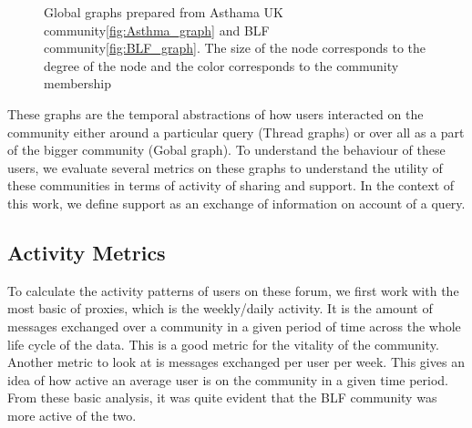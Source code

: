 \begin{figure}[!ht]
    \centering
    \caption{Global graphs prepared from Asthama UK community\ref{fig:Asthma_graph} and BLF community\ref{fig:BLF_graph}. The size of the node corresponds to the degree of the node and the color corresponds to the community membership }
\end{figure}

These graphs are the temporal abstractions of how users interacted on the community either around a particular query (Thread graphs) or over all as a part of the bigger community (Gobal graph). To understand the behaviour of these users, we evaluate several metrics on these graphs to understand the utility of these communities in terms of activity of sharing and support. In the context of this work, we define support as an exchange of information on account of a query.

\subsection{Activity Metrics}
To calculate the activity patterns of users on these forum, we first work with the most basic of proxies, which is the weekly/daily activity. It is the amount of messages exchanged over a community in a given period of time across the whole life cycle of the data. This is a good metric for the vitality of the community. Another metric to look at is messages exchanged per user per week. This gives an idea of how active an average user is on the community in a given time period. From these basic analysis, it was quite evident that the BLF community was more active of the two. 

